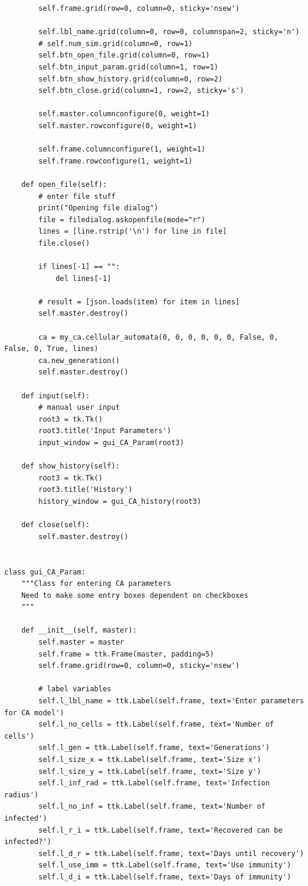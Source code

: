 \documentclass[11pt, a4paper]{article}
\begin{document}
\begin{lstlisting}
        self.frame.grid(row=0, column=0, sticky='nsew')

        self.lbl_name.grid(column=0, row=0, columnspan=2, sticky='n')
        # self.num_sim.grid(column=0, row=1)
        self.btn_open_file.grid(column=0, row=1)
        self.btn_input_param.grid(column=1, row=1)
        self.btn_show_history.grid(column=0, row=2)
        self.btn_close.grid(column=1, row=2, sticky='s')

        self.master.columnconfigure(0, weight=1)
        self.master.rowconfigure(0, weight=1)

        self.frame.columnconfigure(1, weight=1)
        self.frame.rowconfigure(1, weight=1)

    def open_file(self):
        # enter file stuff
        print("Opening file dialog")
        file = filedialog.askopenfile(mode="r")
        lines = [line.rstrip('\n') for line in file]
        file.close()

        if lines[-1] == "":
            del lines[-1]

        # result = [json.loads(item) for item in lines]
        self.master.destroy()

        ca = my_ca.cellular_automata(0, 0, 0, 0, 0, 0, False, 0, False, 0, True, lines)
        ca.new_generation()
        self.master.destroy()

    def input(self):
        # manual user input
        root3 = tk.Tk()
        root3.title('Input Parameters')
        input_window = gui_CA_Param(root3)

    def show_history(self):
        root3 = tk.Tk()
        root3.title('History')
        history_window = gui_CA_history(root3)

    def close(self):
        self.master.destroy()


class gui_CA_Param:
    """Class for entering CA parameters
    Need to make some entry boxes dependent on checkboxes
    """

    def __init__(self, master):
        self.master = master
        self.frame = ttk.Frame(master, padding=5)
        self.frame.grid(row=0, column=0, sticky='nsew')

        # label variables
        self.l_lbl_name = ttk.Label(self.frame, text='Enter parameters for CA model')
        self.l_no_cells = ttk.Label(self.frame, text='Number of cells')
        self.l_gen = ttk.Label(self.frame, text='Generations')
        self.l_size_x = ttk.Label(self.frame, text='Size x')
        self.l_size_y = ttk.Label(self.frame, text='Size y')
        self.l_inf_rad = ttk.Label(self.frame, text='Infection radius')
        self.l_no_inf = ttk.Label(self.frame, text='Number of infected')
        self.l_r_i = ttk.Label(self.frame, text='Recovered can be infected?')
        self.l_d_r = ttk.Label(self.frame, text='Days until recovery')
        self.l_use_imm = ttk.Label(self.frame, text='Use immunity')
        self.l_d_i = ttk.Label(self.frame, text='Days of immunity')


\end{lstlisting}
\end{document}
